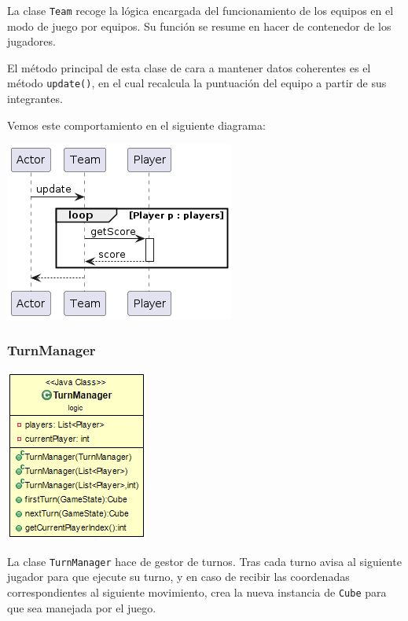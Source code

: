 \documentclass[../DocumentoOficial.tex]{subfiles}
\begin{document}
La clase \texttt{Team} recoge la lógica encargada del funcionamiento de los equipos en el modo de juego por equipos. Su función se resume en hacer de contenedor de los jugadores.

El método principal de esta clase de cara a mantener datos coherentes es el método \texttt{update()}, en el cual recalcula la puntuación del equipo a partir de sus integrantes.

Vemos este comportamiento en el siguiente diagrama:

\begin{center}
\includegraphics[scale=0.75]{Team.update()-sprint7.png} 
\end{center}

\subsubsection{TurnManager}

\begin{center}
\includegraphics[scale=0.75]{TurnManager-sprint7.png} 
\end{center}

La clase \texttt{TurnManager} hace de gestor de turnos. Tras cada turno avisa al siguiente jugador para que ejecute su turno, y en caso de recibir las coordenadas correspondientes al siguiente movimiento, crea la nueva instancia de \texttt{Cube} para que sea manejada por el juego.
\end{document}
